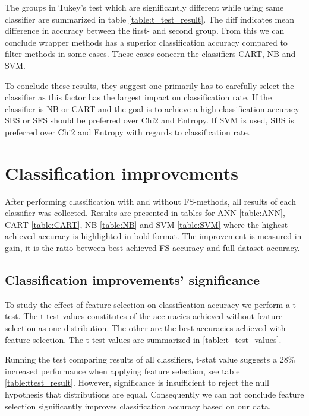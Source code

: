 The groups in Tukey's test which are significantly different while using same classifier are summarized in table \ref{table:t_test_result}. The diff indicates mean difference in accuracy between the first- and second group. From this we can conclude wrapper methods has a superior classification accuracy compared to filter methods in some cases. These cases concern the classifiers CART, NB and SVM.



To conclude these results, they suggest one primarily has to carefully select the classifier as this factor has the largest impact on classification rate. If the classifier is NB or CART and the goal is to achieve a high classification accuracy SBS or SFS should be preferred over Chi2 and Entropy. If SVM is used, SBS is preferred over Chi2 and Entropy with regards to classification rate.


\section{Classification improvements}

After performing classification with and without FS-methods, all results of each classifier was collected. Results are presented in tables for ANN \ref{table:ANN}, CART \ref{table:CART}, NB \ref{table:NB} and SVM \ref{table:SVM} where the highest achieved accuracy is highlighted in bold format. The improvement is measured in gain, it is the ratio between best achieved FS accuracy and full dataset accuracy.



\subsection{Classification improvements' significance}
\label{sec:Investigation_improvement}

To study the effect of feature selection on classification accuracy we perform a t-test. The t-test values constitutes of the accuracies achieved without feature selection as one distribution. The other are the best accuracies achieved with feature selection. The t-test values are summarized in \ref{table:t_test_values}.



Running the test comparing results of all classifiers, t-stat value suggests a 28\% increased performance when applying feature selection, see table \ref{table:ttest_result}. However, significance is insufficient to reject the null hypothesis that distributions are equal. Consequently we can not conclude feature selection significantly improves classification accuracy based on our data.

